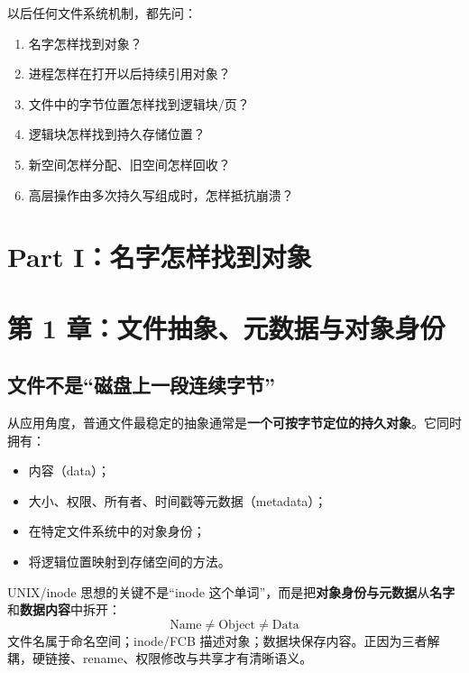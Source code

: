 \documentclass[11pt,a4paper]{ctexart}
\newcommand{\kw}[1]{\textbf{#1}}
\begin{document}
\begin{method}[文件系统六问]
以后任何文件系统机制，都先问：
\begin{enumerate}
  \item 名字怎样找到对象？
  \item 进程怎样在打开以后持续引用对象？
  \item 文件中的字节位置怎样找到逻辑块/页？
  \item 逻辑块怎样找到持久存储位置？
  \item 新空间怎样分配、旧空间怎样回收？
  \item 高层操作由多次持久写组成时，怎样抵抗崩溃？
\end{enumerate}
\end{method}

\section{Part I：名字怎样找到对象}

\section{第 1 章：文件抽象、元数据与对象身份}

\subsection{文件不是“磁盘上一段连续字节”}
从应用角度，普通文件最稳定的抽象通常是\kw{一个可按字节定位的持久对象}。它同时拥有：
\begin{itemize}
  \item 内容（data）；
  \item 大小、权限、所有者、时间戳等元数据（metadata）；
  \item 在特定文件系统中的对象身份；
  \item 将逻辑位置映射到存储空间的方法。
\end{itemize}

\begin{corebox}[元数据与数据分离]
UNIX/inode 思想的关键不是“inode 这个单词”，而是把\kw{对象身份与元数据}从\kw{名字}和\kw{数据内容}中拆开：
\[
\boxed{\text{Name}\neq\text{Object}\neq\text{Data}}
\]
文件名属于命名空间；inode/FCB 描述对象；数据块保存内容。正因为三者解耦，硬链接、rename、权限修改与共享才有清晰语义。
\end{corebox}
\end{document}
